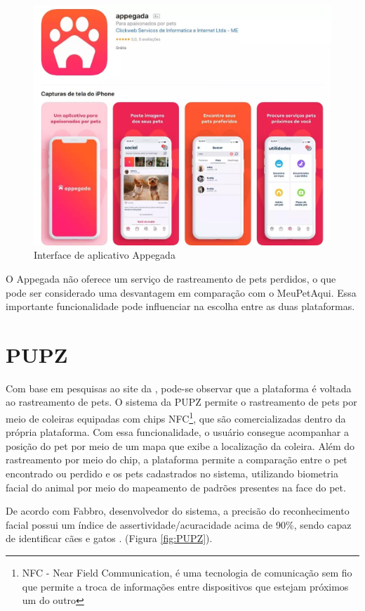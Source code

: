 \begin{figure}[htb]
     \centering
     \includegraphics[width=12cm]{arquivos/Figuras/image8.png}
     \caption{Interface de aplicativo Appegada}
     \label{fig:Appegada}
\end{figure}

O Appegada não oferece um serviço de rastreamento de pets perdidos, o que pode ser considerado uma desvantagem em comparação com o MeuPetAqui. Essa importante funcionalidade pode influenciar na escolha entre as duas plataformas.

\newpage
\section{PUPZ}
Com base em pesquisas ao site da , pode-se observar que a plataforma é voltada ao rastreamento de pets. O sistema da PUPZ permite o rastreamento de pets por meio de coleiras equipadas com chips NFC\footnote{NFC - Near Field Communication, é uma tecnologia de comunicação sem fio que permite a troca de informações entre dispositivos que estejam próximos um do outro}, que são comercializadas dentro da própria plataforma. Com essa funcionalidade, o usuário consegue acompanhar a posição do pet por meio de um mapa que exibe a localização da coleira. Além do rastreamento por meio do chip, a plataforma permite a comparação entre o pet encontrado ou perdido e os pets cadastrados no sistema, utilizando biometria facial do animal por meio do mapeamento de padrões presentes na face do pet.

De acordo com Fabbro, desenvolvedor do sistema, a precisão do reconhecimento facial possui um índice de assertividade/acuracidade acima de 90\%, sendo capaz de identificar cães e gatos \cite{Fabbro}. (Figura \ref{fig:PUPZ}).

